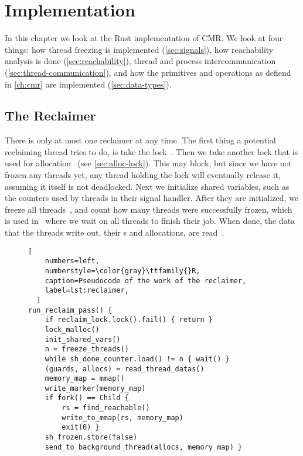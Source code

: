 \chapter{Implementation\label{ch:implementation}}

In this chapter we look at the Rust implementation of CMR\@.  We look at four things: how thread
freezing is implemented (\cref{sec:signals}), how reachability analysis is done
(\cref{sec:reachability}), thread and process intercommunication
(\cref{sec:thread-communication}), and how the primitives and operations as defiend in
\cref{ch:cmr} are implemented (\cref{sec:data-types}).


\section{The Reclaimer\label{sec:thread-communication}}

There is only at most one reclaimer at any time. The first thing a potential reclaiming thread
tries to do, is take the lock~. Then we take another lock that is used for
allocation~ (see \cref{sec:alloc-lock}). This may block, but since we have not
frozen any threads yet, any thread holding the lock will eventually release it, assuming it itself
is not deadlocked. Next we initialize shared variables, such as the counters used by threads in
their signal handler. After they are initialized, we freeze all threads~, and count how
many threads were successfully frozen, which is used in~ where we wait on all threads
to finish their job. When done, the data that the threads write out, their s and
allocations, are read~.

\begin{figure}[ht]
  \begin{lstlisting}[
    numbers=left,
    numberstyle=\color{gray}\ttfamily{}R,
    caption=Pseudocode of the work of the reclaimer,
    label=lst:reclaimer,
  ]
run_reclaim_pass() {
    if reclaim_lock.lock().fail() { return }
    lock_malloc()
    init_shared_vars()
    n = freeze_threads()
    while sh_done_counter.load() != n { wait() }
    (guards, allocs) = read_thread_datas()
    memory_map = mmap()
    write_marker(memory_map)
    if fork() == Child {
        rs = find_reachable()
        write_to_mmap(rs, memory_map)
        exit(0) }
    sh_frozen.store(false)
    send_to_background_thread(allocs, memory_map) }\end{lstlisting}
\end{figure}

